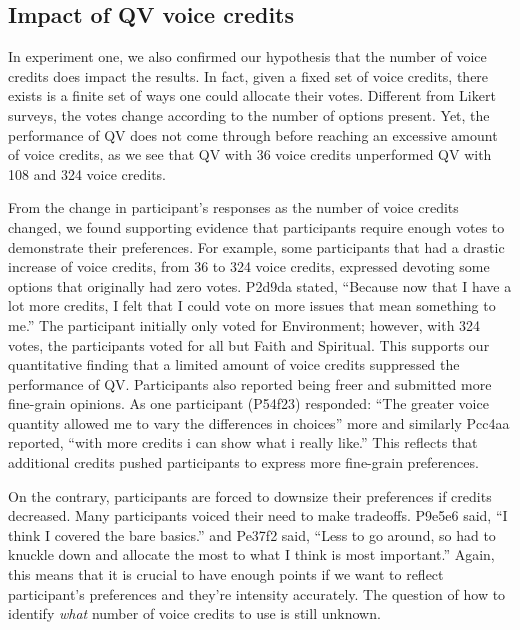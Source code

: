\subsection{Impact of QV voice credits}
In experiment one, we also confirmed our hypothesis that the number of voice credits does impact the results. 
In fact, given a fixed set of voice credits, there exists is a finite set of ways one could allocate their votes. 
Different from Likert surveys, the votes change according to the number of options present.
Yet, the performance of QV does not come through before reaching an excessive amount of voice credits, as we see that QV with 36 voice credits unperformed QV with 108 and 324 voice credits.

From the change in participant's responses as the number of voice credits changed, we found supporting evidence that participants require enough votes to demonstrate their preferences.
For example, some participants that had a drastic increase of voice credits, from 36 to 324 voice credits, expressed devoting some options that originally had zero votes. 
P2d9da stated, ``Because now that I have a lot more credits, I felt that I could vote on more issues that mean something to me.'' The participant initially only voted for Environment; however, with 324 votes, the participants voted for all but Faith and Spiritual. This supports our quantitative finding that a limited amount of voice credits suppressed the performance of QV. Participants also reported being freer and submitted more fine-grain opinions. As one participant (P54f23) responded: ``The greater voice quantity allowed me to vary the differences in choices'' more and similarly Pcc4aa reported, ``with more credits i can show what i really like.''
This reflects that additional credits pushed participants to express more fine-grain preferences.

On the contrary, participants are forced to downsize their preferences if credits decreased. Many participants voiced their need to make tradeoffs. P9e5e6 said, ``I think I covered the bare basics.'' and Pe37f2 said, ``Less to go around, so had to knuckle down and allocate the most to what I think is most important.'' 
Again, this means that it is crucial to have enough points if we want to reflect participant's preferences and they're intensity accurately.
The question of how to identify \textit{what} number of voice credits to use is still unknown.

